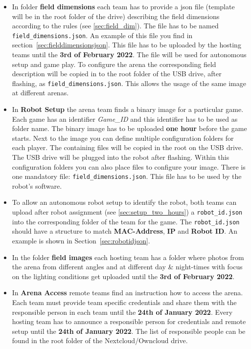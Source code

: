 \begin{itemize}
    \item In folder \textbf{field dimensions} each team has to provide a json file (template will be in the root folder of the drive) describing the field dimensions according to the rules (see \ref{sec:field_dim}). The file has to be named \texttt{field\_dimensions.json}. An example of this file you find in section~\ref{sec:fielddimensionsjson}. This file has to be uploaded by the hosting teams until the \textbf{3rd of February 2022}. The file will be used for autonomous setup and game play. To configure the arena the corresponding field description will be copied in to the root folder of the USB drive, after flashing, as \texttt{field\_dimensions.json}. This allows the usage of the same image at different arenas.
    \item In \textbf{Robot Setup} the arena team finds a binary image for a particular game. Each game has an identifier \textit{Game\_ID} and this identifier has to be used as folder name. The binary image has to be uploaded \textbf{one hour} before the game starts. Next to the image you can define multiple configuration folders for each player. The containing files will be copied in the root on the USB drive. The USB drive will be plugged into the robot after flashing. Within this configuration folders you can also place files to configure your image. There is one mandatory file: \texttt{field\_dimensions.json}. This file has to be used by the robot's software.
    \item To allow an autonomous robot setup to identify the robot, both teams can upload after robot assignment (see \ref{sec:setup_two_hours}) a \texttt{robot\_id.json} into the corresponding folder of the team for the game. The \texttt{robot\_id.json} should have a structure to match \textbf{MAC-Address}, \textbf{IP} and \textbf{Robot ID}. An example is shown in Section~\ref{sec:robotidjson}.
    \item In the folder \textbf{field images} each hosting team has a folder where photos from the arena from different angles and at different day \& night-times with focus on the lighting conditions get uploaded until the \textbf{3rd of February 2022}.
    \item In \textbf{Arena Access} remote teams find an instruction how to access the arena. Each team must provide team specific credentials and share them with the responsible person in each team until the \textbf{24th of January 2022}. Every hosting team has to announce a responsible person for credentials and remote setup until the \textbf{24th of January 2022}. The list of responsible people can be found in the root folder of the Nextcloud/Owncloud drive.

\end{itemize}
